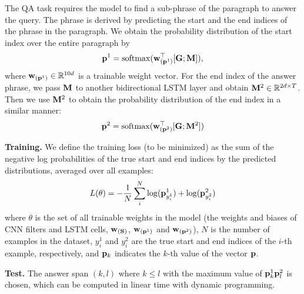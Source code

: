 The QA task requires the model to find a sub-phrase of the paragraph to answer the query. The phrase is derived by predicting the start and the end indices of the phrase in the paragraph. We obtain the probability distribution of the start index over the entire paragraph by
\begin{equation}
{\bf p}^{1} = \mathrm{softmax}({\bf w}_{({\bf p}^1)}^\top[{\bf G};{\bf M}]),
\end{equation}
where ${\bf w}_{({\bf p}^1)} \in \mathbb{R}^{10d}$ is a trainable weight vector.
For the end index of the answer phrase, we pass ${\bf M}$ to another bidirectional LSTM layer and obtain ${\bf M}^2 \in \mathbb{R}^{2d \times T}$.
Then we use ${\bf M}^2$ to obtain the probability distribution of the end index in a similar manner:
\begin{equation}
{\bf p}^{2} = \mathrm{softmax}({\bf w}_{({\bf p}^2)}^\top[{\bf G};{\bf M}^2])
\end{equation}

\textbf{Training.}
We define the training loss (to be minimized) as the sum of the negative log probabilities of the true start and end indices by the predicted distributions, averaged over all examples:
\begin{equation}
L(\theta) = -\frac{1}{N}\sum^N_i \log({\bf p}^1_{y^1_i}) + \log({\bf p}^2_{y^2_i})
\end{equation}
where $\theta$ is the set of all trainable weights in the model (the weights and biases of CNN filters and LSTM cells, ${\bf w}_{({\bf S})}$, ${\bf w}_{({\bf p}^1)}$ and ${\bf w}_{({\bf p}^2)}$),
$N$ is the number of examples in the dataset,
$y^1_i$ and $y^2_i$ are the true start and end indices of the $i$-th example, respectively,
and ${\bf p}_k$ indicates the $k$-th value of the vector ${\bf p}$.

\textbf{Test.}
The answer span $(k, l)$ where $k \leq l$ with the maximum value of ${\bf p}^1_k {\bf p}^2_l$ is chosen, which can be computed in linear time with dynamic programming.